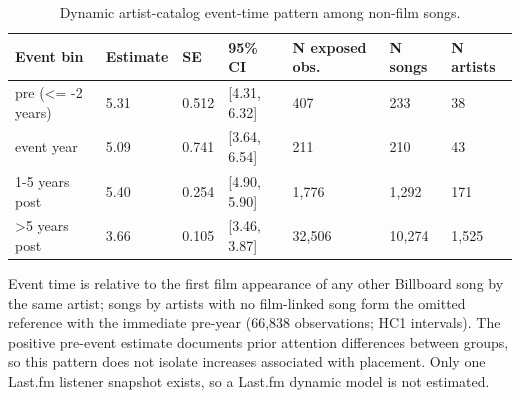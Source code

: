 \begin{table}[!htbp]
\centering
\footnotesize
\caption{Dynamic artist-catalog event-time pattern among non-film songs.}
\label{tab:si-catalog-dynamic}
\renewcommand{\arraystretch}{1.05}
\begin{tabular}{lllllll}
\toprule
Event bin & Estimate & SE & 95\% CI & N exposed obs. & N songs & N artists \\
\midrule
pre (<= -2 years) & 5.31 & 0.512 & [4.31, 6.32] & 407 & 233 & 38 \\
event year & 5.09 & 0.741 & [3.64, 6.54] & 211 & 210 & 43 \\
1-5 years post & 5.40 & 0.254 & [4.90, 5.90] & 1,776 & 1,292 & 171 \\
>5 years post & 3.66 & 0.105 & [3.46, 3.87] & 32,506 & 10,274 & 1,525 \\
\bottomrule
\end{tabular}
\begin{flushleft}\footnotesize
Event time is relative to the first film appearance of any other Billboard song by the same artist; songs by artists with no film-linked song form the omitted reference with the immediate pre-year (66{,}838 observations; HC1 intervals). The positive pre-event estimate documents prior attention differences between groups, so this pattern does not isolate increases associated with placement. Only one Last.fm listener snapshot exists, so a Last.fm dynamic model is not estimated.
\end{flushleft}
\end{table}
